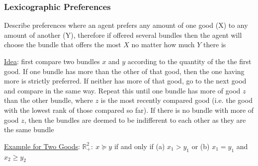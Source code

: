 \documentclass{article}
\begin{document}
\subsubsection{Lexicographic Preferences}
Describe preferences where an agent prefers any amount of one good (X) to any amount of another (Y), therefore if offered several bundles then the agent will choose the bundle that offers the most $X$ no matter how much $Y$ there is \par \vspace{0.3em}
  \underline{Idea}: first compare two bundles $x$ and $y$ according to the quantity of the the first good. If one bundle has more than the other of that good, then the one having more is strictly preferred. If neither has more of that good, go to the next good and compare in the same way. Repeat this until one bundle has more of good $z$ than the other bundle, where $z$ is the most recently compared good (i.e. the good with the lowest rank of those compared so far). If there is no bundle with more of good $z$, then the bundles are deemed to be indifferent to each other as they are the same bundle \par
  \underline{Example for Two Goods}: $\mathbb{R}_{+}^{2}: \ x \succeq y$ if and only if (a) $x_{1} > y_{1}$ or (b) $x_{1} = y_{1}$ and $x_{2} \geq y_{2}$
\end{document}
